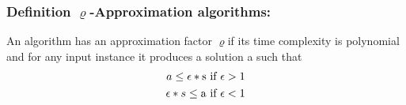 \subsubsection{Definition $\varrho$-Approximation algorithms:}
An algorithm has an approximation factor $\varrho$if its time complexity is polynomial and for any input instance it produces a solution a such that\\
\begin{subequations}
\renewcommand{\theequation}{\arabic{parentequation}--\arabic{equation}}
\begin{align}
    a \le \epsilon * \text{s} \vspace{0.5cm} & \text{ if }\epsilon > 1\\
    \epsilon * s \le \text{a} \vspace{0.5cm} & \text{ if }\epsilon < 1
\end{align}
\end{subequations}
